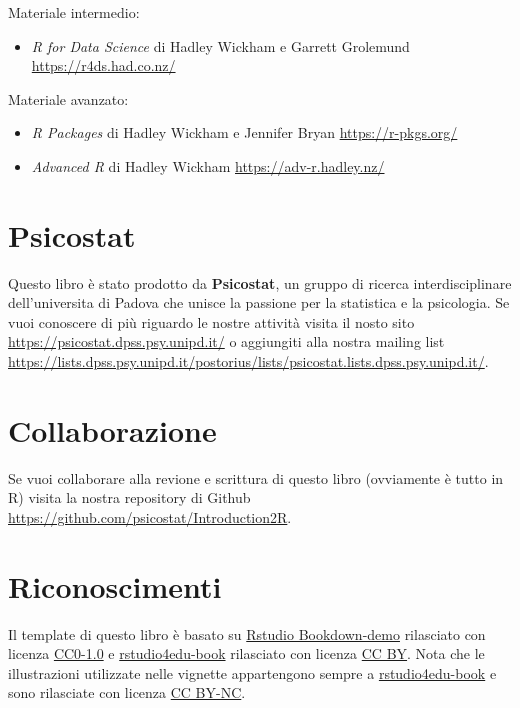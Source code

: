 \documentclass[
]{book}
\providecommand{\tightlist}{%
  \setlength{\itemsep}{0pt}\setlength{\parskip}{0pt}}
\begin{document}
Materiale intermedio:

\begin{itemize}
\tightlist
\item
  \emph{R for Data Science} di Hadley Wickham e Garrett Grolemund \url{https://r4ds.had.co.nz/}
\end{itemize}

Materiale avanzato:

\begin{itemize}
\tightlist
\item
  \emph{R Packages} di Hadley Wickham e Jennifer Bryan \url{https://r-pkgs.org/}
\item
  \emph{Advanced R} di Hadley Wickham \url{https://adv-r.hadley.nz/}
\end{itemize}

\hypertarget{psicostat}{%
\section*{Psicostat}\label{psicostat}}

Questo libro è stato prodotto da \textbf{Psicostat}, un gruppo di ricerca interdisciplinare dell'universita di Padova che unisce la passione per la statistica e la psicologia. Se vuoi conoscere di più riguardo le nostre attività visita il nosto sito \url{https://psicostat.dpss.psy.unipd.it/} o aggiungiti alla nostra mailing list \url{https://lists.dpss.psy.unipd.it/postorius/lists/psicostat.lists.dpss.psy.unipd.it/}.

\hypertarget{collaborazione}{%
\section*{Collaborazione}\label{collaborazione}}

Se vuoi collaborare alla revione e scrittura di questo libro (ovviamente è tutto in R) visita la nostra repository di Github \url{https://github.com/psicostat/Introduction2R}.

\hypertarget{riconoscimenti}{%
\section*{Riconoscimenti}\label{riconoscimenti}}

Il template di questo libro è basato su \href{https://github.com/rstudio/bookdown-demo}{Rstudio Bookdown-demo} rilasciato con licenza \href{https://creativecommons.org/publicdomain/zero/1.0/}{CC0-1.0} e \href{https://rstudio4edu.github.io/rstudio4edu-book/}{rstudio4edu-book} rilasciato con licenza \href{https://creativecommons.org/licenses/by/2.0/}{CC BY}. Nota che le illustrazioni utilizzate nelle vignette appartengono sempre a \href{https://rstudio4edu.github.io/rstudio4edu-book/}{rstudio4edu-book} e sono rilasciate con licenza \href{https://creativecommons.org/licenses/by-nc/2.0/}{CC BY-NC}.
\end{document}
